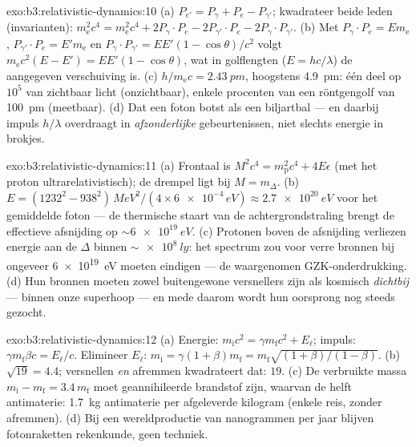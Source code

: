 \begin{solution}{exo:b3:relativistic-dynamics:10}
(a) $P_{e'} = P_\gamma + P_e - P_{\gamma'}$; kwadrateer beide leden
(invarianten): $m_{\text{e}}^2c^4 = m_{\text{e}}^2c^4 + 2P_\gamma\!
\cdot\!P_e - 2P_{\gamma'}\!\cdot\!P_e - 2P_\gamma\!\cdot\!P_{\gamma'}$.
(b) Met $P_\gamma\!\cdot\!P_e = E m_{\text{e}}$,
$P_{\gamma'}\!\cdot\!P_e = E'm_{\text{e}}$ en $P_\gamma\!\cdot\!
P_{\gamma'} = EE'(1 - \cos\theta)/c^2$ volgt
$m_{\text{e}}c^2(E - E') = EE'(1 - \cos\theta)$, wat in golflengten
($E = hc/\lambda$) de aangegeven verschuiving is. (c) $h/m_{\text{e}}c =
\qty{2.43}{pm}$, hoogstens \qty{4.9}{pm}: één deel op $10^5$ van
zichtbaar licht (onzichtbaar), enkele procenten van een röntgengolf van
\qty{100}{pm} (meetbaar). (d) Dat een foton botst als een biljartbal ---
en daarbij impuls $h/\lambda$ overdraagt in \emph{afzonderlijke}
gebeurtenissen, niet slechts energie in brokjes.
\end{solution}

\begin{solution}{exo:b3:relativistic-dynamics:11}
(a) Frontaal is $M^2c^4 = m_{\text{p}}^2c^4 + 4E\epsilon$ (met het proton
ultrarelativistisch); de drempel ligt bij $M = m_\Delta$. (b) $E =
(1232^2 - 938^2)\,\unit{MeV^2}/(4 \times \num{6e-4}\,\unit{eV})
\approx \qty{2.7e20}{eV}$ voor het gemiddelde foton --- de thermische
staart van de achtergrondstraling brengt de effectieve afsnijding op
$\sim\qty{6e19}{eV}$. (c) Protonen boven de afsnijding verliezen energie
aan de $\Delta$ binnen $\sim\qty{e8}{ly}$: het spectrum zou voor verre
bronnen bij ongeveer \qty{6e19}{eV} moeten eindigen --- de waargenomen
GZK-onderdrukking. (d) Hun bronnen moeten zowel buitengewone versnellers
zijn als kosmisch \emph{dichtbij} --- binnen onze superhoop --- en mede
daarom wordt hun oorsprong nog steeds gezocht.
\end{solution}

\begin{solution}{exo:b3:relativistic-dynamics:12}
(a) Energie: $m_{\text{i}}c^2 = \gamma m_{\text{f}}c^2 + E_\ell$;
impuls: $\gamma m_{\text{f}}\beta c = E_\ell/c$. Elimineer $E_\ell$:
$m_{\text{i}} = \gamma(1 + \beta)m_{\text{f}} =
m_{\text{f}}\sqrt{(1+\beta)/(1-\beta)}$. (b) $\sqrt{19} = 4.4$;
versnellen \emph{en} afremmen kwadrateert dat: $19$. (c) De verbruikte
massa $m_{\text{i}} - m_{\text{f}} = 3.4\,m_{\text{f}}$ moet
geannihileerde brandstof zijn, waarvan de helft antimaterie:
\qty{1.7}{kg} antimaterie per afgeleverde kilogram (enkele reis, zonder
afremmen). (d) Bij een wereldproductie van nanogrammen per jaar blijven
fotonraketten rekenkunde, geen techniek.
\end{solution}

